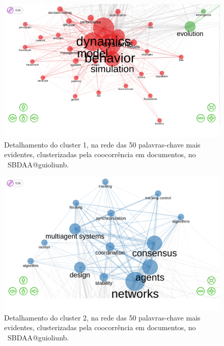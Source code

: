 \begin{figure}
    \centering
    \includegraphics[width=1\textwidth]{experiments/jhcf/PesqBibliogr/SimulacaoMultiagente/WoS-20220203/Estrutura/Conceitual/MASSA2-Cluster1-Co-occurrence-Network-50nodes-louvainclustering.png.png}
    \caption{Detalhamento do cluster 1, na rede das 50 palavras-chave mais evidentes, clusterizadas pela coocorrência em documentos, no  \dataset\ SBDAA@guioliunb.}
    \label{fig:MASSA2-Cluster1-Co-occurrence-Network-50nodes-louvainclustering.png}
\end{figure}

\begin{figure}
    \centering
    \includegraphics[width=1\textwidth]{experiments/jhcf/PesqBibliogr/SimulacaoMultiagente/WoS-20220203/Estrutura/Conceitual/MASSA2-Cluster2-Co-occurrence-Network-50nodes-louvainclustering.png.png.png}
    \caption{Detalhamento do cluster 2, na rede das 50 palavras-chave mais evidentes, clusterizadas pela coocorrência em documentos, no  \dataset\ SBDAA@guioliunb.}
    \label{fig:MASSA2-Cluster2-Co-occurrence-Network-50nodes-louvainclustering.png.png}
\end{figure}

